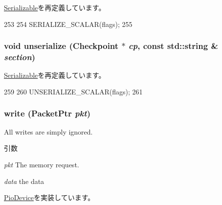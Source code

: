 \hyperlink{classSerializable_ad6272f80ae37e8331e3969b3f072a801}{Serializable}を再定義しています。


\begin{DoxyCode}
253 {
254     SERIALIZE_SCALAR(flags);
255 }
\end{DoxyCode}
\hypertarget{classRealViewCtrl_af22e5d6d660b97db37003ac61ac4ee49}{
\subsubsection[{unserialize}]{\setlength{\rightskip}{0pt plus 5cm}void unserialize ({\bf Checkpoint} $\ast$ {\em cp}, \/  const std::string \& {\em section})}}
\label{classRealViewCtrl_af22e5d6d660b97db37003ac61ac4ee49}


\hyperlink{classSerializable_af100c4e9feabf3cd918619c88c718387}{Serializable}を再定義しています。


\begin{DoxyCode}
259 {
260     UNSERIALIZE_SCALAR(flags);
261 }
\end{DoxyCode}
\hypertarget{classRealViewCtrl_a4cefab464e72b5dd42c003a0a4341802}{
\subsubsection[{write}]{ write ({\bf PacketPtr} {\em pkt})}}
\label{classRealViewCtrl_a4cefab464e72b5dd42c003a0a4341802}
All writes are simply ignored. 
\begin{DoxyParams}{引数}
\item[{\em pkt}]The memory request. \item[{\em data}]the data \end{DoxyParams}


\hyperlink{classPioDevice_afe8371668d023bb2516b286e5e399b6f}{PioDevice}を実装しています。


